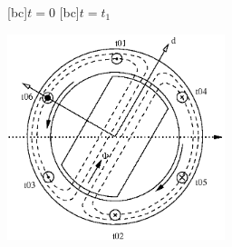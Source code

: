 \begin{psfrags}%
\psfragscanon

[bc]{$t=0$}
[bc]{$t=t_1$}

\includegraphics[height=6cm]{figs/f_mmf_rotationb.eps}
\end{psfrags}%